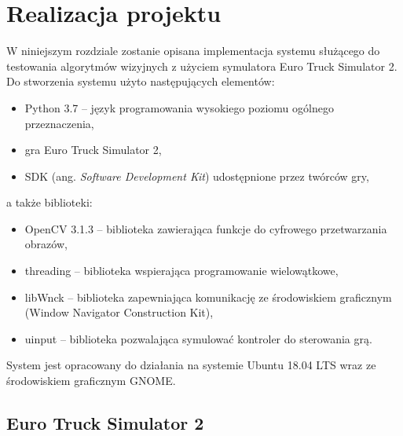 \chapter{Realizacja projektu}


W niniejszym rozdziale zostanie opisana implementacja systemu służącego do testowania algorytmów wizyjnych z użyciem symulatora Euro Truck Simulator 2. 
Do stworzenia systemu użyto następujących elementów:
\begin{itemize}
\item Python 3.7 -- język programowania wysokiego poziomu ogólnego przeznaczenia,
\item gra Euro Truck Simulator 2,
\item SDK (ang. \textit{Software Development Kit}) udostępnione przez twórców gry,
\end{itemize}
a także biblioteki: 
\begin{itemize}
\item OpenCV 3.1.3 -- biblioteka zawierająca funkcje do cyfrowego przetwarzania obrazów,
\item threading -- biblioteka wspierająca programowanie wielowątkowe,
\item libWnck -- biblioteka zapewniająca komunikację ze środowiskiem graficznym (Window Navigator Construction Kit),
\item uinput -- biblioteka pozwalająca symulować kontroler do sterowania grą.
\end{itemize}

System jest opracowany do działania na systemie Ubuntu 18.04 LTS wraz ze środowiskiem graficznym GNOME.

\section{Euro Truck Simulator 2}


